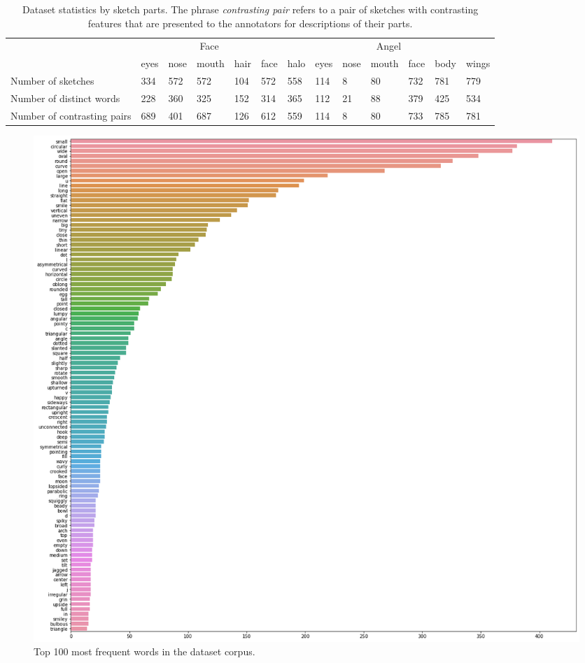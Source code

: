 \begin{table}[!htb]
\begin{minipage}{1\textwidth}
\begin{center}
{\small
\begin{tabular}{p{9em} | p{1.5em}p{1.5em}p{2em}p{1.5em}p{1.5em} | p{1.5em}p{1.5em}p{1.5em}p{2em}p{1.5em}p{1.5em}p{1.5em} }
\toprule
& \multicolumn{5}{c}{Face} & \multicolumn{7}{c}{Angel}\\
~ & eyes & nose & mouth & hair & face & halo & eyes & nose & mouth & face & body & wings  \\
\midrule
Number of sketches & 
334 & 572 & 572 & 104 & 572 &
558 & 114 & 8 & 80 & 732 & 781 & 779 \\
Number of distinct words & 
228 & 360 & 325 & 152 & 314 & 
365 & 112 & 21 & 88 & 379 & 425 & 534 \\
Number of contrasting pairs &
689 & 401 & 687 & 126 & 612 &
559 & 114 & 8 & 80 & 733 & 785 & 781 \\
\bottomrule
\end{tabular}}
\caption{Dataset statistics by sketch parts. The phrase \textit{contrasting pair} refers to a pair of sketches with contrasting features that are presented to the annotators for descriptions of their parts.}
\label{table:dataset_stats_byparts}
\end{center}
\end{minipage}
\end{table}

\begin{figure}[!htb]
\includegraphics[width=\linewidth]{dataset_image/word_freq_face.png}  
\caption{Top 100 most frequent words in the dataset corpus.}
\label{word_freq}
\end{figure}

